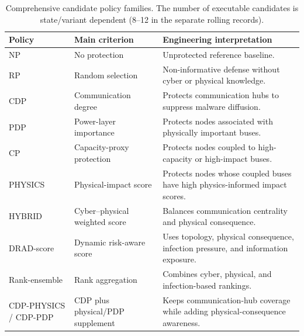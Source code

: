 \begin{table}[tbp]
\centering
\small
\begin{threeparttable}
\caption{Comprehensive candidate policy families. The number of executable candidates is state/variant dependent (8--12 in the separate rolling records).}
\label{tab:candidate_policies}
\begin{tabularx}{0.96\textwidth}{l l X}
\toprule
\rowcolor{TableHeader}
Policy & Main criterion & Engineering interpretation \\
\midrule
\rowcolor{RowWeak}
NP & No protection & Unprotected reference baseline. \\
\rowcolor{RowNeutral}
RP & Random selection & Non-informative defense without cyber or physical knowledge. \\
\rowcolor{RowBaseline}
CDP & Communication degree & Protects communication hubs to suppress malware diffusion. \\
\rowcolor{RowPhysical}
PDP & Power-layer importance & Protects nodes associated with physically important buses. \\
\rowcolor{RowPhysical}
CP & Capacity-proxy protection & Protects nodes coupled to high-capacity or high-impact buses. \\
\rowcolor{RowPhysical}
PHYSICS & Physical-impact score & Protects nodes whose coupled buses have high physics-informed impact scores. \\
\rowcolor{RowScenario}
HYBRID & Cyber--physical weighted score & Balances communication centrality and physical consequence. \\
\rowcolor{RowRisk}
DRAD-score & Dynamic risk-aware score & Uses topology, physical consequence, infection pressure, and information exposure. \\
\rowcolor{RowRisk}
Rank-ensemble & Rank aggregation & Combines cyber, physical, and infection-based rankings. \\
\rowcolor{RowProposed}
CDP-PHYSICS / CDP-PDP & CDP plus physical/PDP supplement & Keeps communication-hub coverage while adding physical-consequence awareness. \\
\bottomrule
\end{tabularx}
\end{threeparttable}
\end{table}
